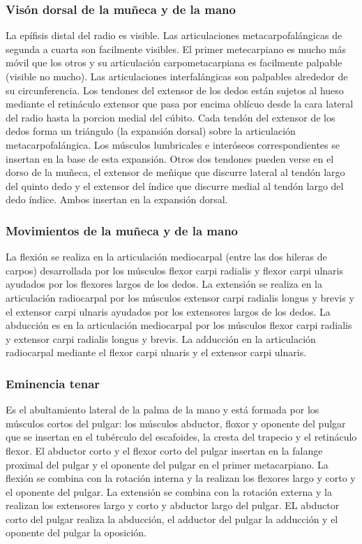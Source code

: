 \documentclass[a4paper,12pt]{article} %
\begin{document}
\begin{appendices}
\subsubsection{Visón dorsal de la muñeca y de la mano}
La epífisis distal del radio es visible. Las articulaciones metacarpofalángicas de segunda a cuarta son facilmente visibles. El primer metecarpiano es mucho más móvil que los otros y su articulación carpometacarpiana es facilmente palpable (visible no mucho). Las articulaciones interfalángicas son palpables alrededor de su circunferencia.
Los tendones del extensor de los dedos están sujetos al hueso mediante el retináculo extensor que pasa por encima oblícuo desde la cara lateral del radio hasta la porcion medial del cúbito. Cada tendón del extensor de los dedos forma un triángulo (la expansión dorsal) sobre la articulación metacarpofalángica. Los músculos lumbricales e interóseos correspondientes se insertan en la base de esta expansión. Otros dos tendones pueden verse en el dorso de la muñeca, el extensor de meñique que discurre lateral al tendón largo del quinto dedo y el extensor del índice que discurre medial al tendón largo del dedo índice. Ambos insertan en la expansión dorsal.

\subsubsection{Movimientos de la muñeca y de la mano}
La flexión se realiza en la articulación mediocarpal (entre las dos hileras de carpos) desarrollada por los músculos flexor carpi radialis y flexor carpi ulnaris ayudados por los flexores largos de los dedos. La extensión se realiza en la articulación radiocarpal por los músculos extensor carpi radialis longus y brevis y el extensor carpi ulnaris ayudados por los extensores largos de los dedos. La abducción es en la articulación mediocarpal por los músculos flexor carpi radialis y extensor carpi radialis longus y brevis. La adducción en la articulación radiocarpal mediante el flexor carpi ulnaris y el extensor carpi ulnaris.

\subsubsection{Eminencia tenar}
Es el abultamiento lateral de la palma de la mano y está formada por los músculos cortos del pulgar: los músculos abductor, floxor y oponente del pulgar que se insertan en el tubérculo del escafoides, la cresta del trapecio y el retináculo flexor. El abductor corto y el flexor corto del pulgar insertan en la falange proximal del pulgar y el oponente del pulgar en el primer metacarpiano.
La flexión se combina con la rotación interna y la realizan los flexores largo y corto y el oponente del pulgar. La extensión se combina con la rotación externa y la realizan los extensores largo y corto y abductor largo del pulgar. EL abductor corto del pulgar realiza la abducción, el adductor del pulgar la adducción y el oponente del pulgar la oposición.


\end{appendices}
\end{document}
